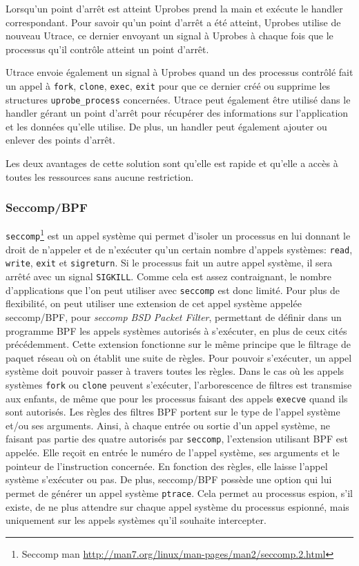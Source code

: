 Lorsqu'un point d'arrêt est atteint Uprobes prend la main et exécute le handler
correspondant. Pour savoir qu'un point d'arrêt a été atteint, Uprobes utilise de
nouveau Utrace, ce dernier envoyant un signal à Uprobes à chaque fois que le
processus qu'il contrôle atteint un point d'arrêt.

Utrace envoie également un signal à Uprobes quand un des processus contrôlé fait
un appel à \texttt{fork}, \texttt{clone}, \texttt{exec}, \texttt{exit} pour que
ce dernier créé ou supprime les structures \texttt{uprobe\_process}
concernées. Utrace peut également être utilisé dans le handler gérant un point
d'arrêt pour récupérer des informations sur l'application et les données qu'elle
utilise. De plus, un handler peut également ajouter ou enlever des points
d'arrêt.

Les deux avantages de cette solution sont qu'elle est rapide et qu'elle a accès
à toutes les ressources sans aucune restriction.

\subsubsection{Seccomp/BPF}
\label{paragraph:seccomp/bpf}

\texttt{seccomp}\footnote{Seccomp man \url{http://man7.org/linux/man-pages/man2/seccomp.2.html}} est un appel système qui permet d'isoler un processus
en lui donnant le droit de n'appeler et de n'exécuter qu'un certain nombre d'appels
systèmes: \texttt{read}, \texttt{write}, \texttt{exit} et \texttt{sigreturn}. Si
le processus fait un autre appel système, il sera arrêté avec un signal
\texttt{SIGKILL}. Comme cela est assez contraignant, le nombre d'applications
que l'on peut utiliser avec \texttt{seccomp} est donc limité. Pour plus de
flexibilité, on peut utiliser une extension de cet appel système appelée
seccomp/BPF, pour \textit{seccomp BSD Packet Filter}, permettant de définir dans
un programme BPF \citep{BPF_mccanne1993bsd} les appels systèmes autorisés à
s'exécuter, en plus de ceux cités précédemment. Cette extension fonctionne sur le
même principe que le filtrage de paquet réseau où on établit une suite de
règles. Pour pouvoir s'exécuter, un appel système doit pouvoir passer à travers
toutes les règles. Dans le cas où les appels systèmes \texttt{fork} ou
\texttt{clone} peuvent s'exécuter, l'arborescence de filtres est transmise aux
enfants, de même que pour les processus faisant des appels \texttt{execve}
quand ils sont autorisés. Les règles des filtres BPF portent sur le type de
l'appel système et/ou ses arguments. Ainsi, à chaque entrée ou sortie d'un appel
système, ne faisant pas partie des quatre autorisés par \texttt{seccomp}, l'extension
utilisant BPF est appelée. Elle reçoit en entrée le numéro de l'appel système,
ses arguments et le pointeur de l'instruction concernée. En fonction des règles,
elle laisse l'appel système s'exécuter ou pas.  De plus, seccomp/BPF possède une
option qui lui permet de générer un appel système \texttt{ptrace}. Cela permet
au processus espion, s'il existe, de ne plus attendre sur chaque appel système
du processus espionné, mais uniquement sur les appels systèmes qu'il souhaite
intercepter.

